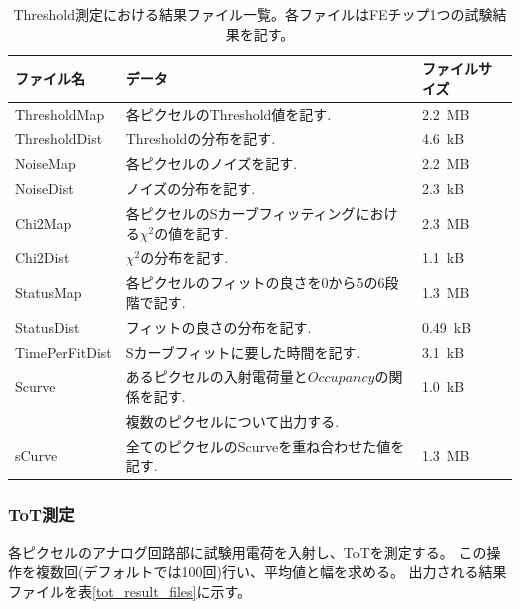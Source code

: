 \begin{table}[tbp]
\begin{center}
\caption[Threshold測定における結果ファイル一覧]{Threshold測定における結果ファイル一覧。各ファイルはFEチップ1つの試験結果を記す。}
\label{threshold_result_files}
  \small
  \begin{tabular}{|lll|} \hline
    ファイル名 & データ & ファイルサイズ \\ \hline
    ThresholdMap   & 各ピクセルのThreshold値を記す.                                                         & 2.2~MB \\
    ThresholdDist  & Thresholdの分布を記す.                                                                 & 4.6~kB \\ 
    NoiseMap       & 各ピクセルのノイズを記す.                                                              & 2.2~MB \\ 
    NoiseDist      & ノイズの分布を記す.                                                                    & 2.3~kB \\ 
    Chi2Map        & 各ピクセルのSカーブフィッティングにおける$\chi^2$の値を記す.                           & 2.3~MB \\ 
    Chi2Dist       & $\chi^2$の分布を記す.                                                                  & 1.1~kB \\ 
    StatusMap      & 各ピクセルのフィットの良さを0から5の6段階で記す.                                       & 1.3~MB \\ 
    StatusDist     & フィットの良さの分布を記す.                                                            & 0.49~kB \\ 
    TimePerFitDist & Sカーブフィットに要した時間を記す.                                                     & 3.1~kB \\ 
    Scurve         & あるピクセルの入射電荷量と$Occupancy$の関係を記す.                                     & 1.0~kB \\ 
                   & 複数のピクセルについて出力する.                                                        &        \\ 
    sCurve         & 全てのピクセルのScurveを重ね合わせた値を記す.                                          & 1.3~MB \\ \hline 
  \end{tabular}
\end{center}
\end{table}

\subsubsection{ToT測定}
各ピクセルのアナログ回路部に試験用電荷を入射し、ToTを測定する。
この操作を複数回(デフォルトでは100回)行い、平均値と幅を求める。
出力される結果ファイルを表\ref{tot_result_files}に示す。

